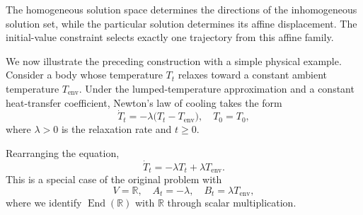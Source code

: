 \documentclass[12pt,a4paper,oneside]{book}
\begin{document}
\begin{example}
\begin{solution}
\begin{center}
\end{center}
The homogeneous solution space determines the directions of the inhomogeneous solution set, while the particular solution
determines its affine displacement. The initial-value constraint selects exactly one trajectory from this affine family.
\end{solution}
\end{example}

\begin{example}

We now illustrate the preceding construction with a simple physical example. Consider a body whose temperature $T_t$
relaxes toward a constant ambient temperature $T_{\mathrm{env}}$. Under the lumped-temperature approximation
and a constant heat-transfer coefficient, Newton's law of cooling takes the form
\begin{equation*}
    \dot T_t = -\lambda\bigl(T_t-T_{\mathrm{env}}\bigr), \quad
    T_0=T_0,
\end{equation*}
where $\lambda>0$ is the relaxation rate and $t\geq 0$.

Rearranging the equation,
\begin{equation*}
    \dot T_t = -\lambda T_t+\lambda T_{\mathrm{env}}.
\end{equation*}
This is a special case of the original problem with
\begin{equation*}
    V=\mathbb R, \quad
    A_t=-\lambda, \quad
    B_t=\lambda T_{\mathrm{env}},
\end{equation*}
where we identify $\operatorname{End}(\mathbb R)$ with $\mathbb R$ through scalar multiplication.


\end{example}
\end{document}
